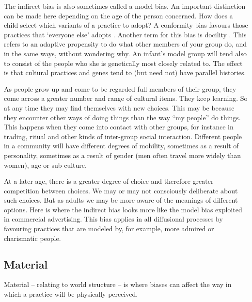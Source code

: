 The indirect bias is also sometimes called a model bias. An important distinction can be made here depending on the age 
of the person concerned. How does a child select which variants of a 
practice to adopt? A conformity bias favours those practices that 
`everyone else' adopts \citep{boyd_culture_1985,gergely_sylvias_2006}. Another term for this bias is docility \citep{simon_mechanism_1990}. This refers to an 
adaptive propensity to do what other 
members of your group do, and in the same ways, without wondering why. An infant's model group will tend also to 
consist of the people who she is genetically most closely related to. 
The effect is that cultural practices and genes tend to (but need not) have 
parallel histories. 

As people grow up and come to be regarded full members of their group, they come across a greater number and range of cultural items. They keep learning. So at any time they may 
find themselves with new choices. This may be because they 
encounter other ways of doing things than the way ``my people'' do things. This happens when they come into contact with other groups, for instance in trading, 
ritual and other kinds of inter-group social interaction. Different 
people in a community will have different degrees of mobility, sometimes as a result of 
personality, sometimes as a result of gender (men often travel more 
widely than women), age or sub-culture. 



At a later age, there is a greater degree of choice and therefore 
greater competition between choices. We may or may not consciously 
deliberate about such choices. But as adults we may be more aware of the 
meanings of different options. Here is where the indirect bias looks 
more like the model bias exploited in commercial advertising. This bias applies in 
all diffusional processes by favouring practices 
that are modeled by, for example, more admired or charismatic people.


\subsection{Material}
Material -- relating to world structure -- is where biases can 
affect the way in which a practice will be physically perceived. 



